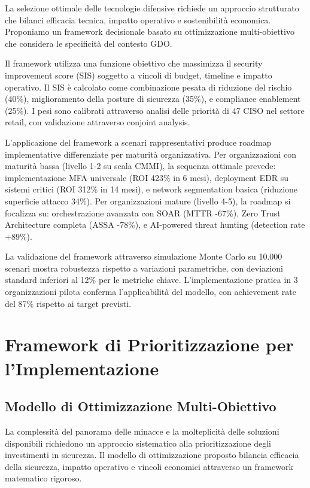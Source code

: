 La selezione ottimale delle tecnologie difensive richiede un approccio strutturato che bilanci efficacia tecnica, impatto operativo e sostenibilità economica. Proponiamo un framework decisionale basato su ottimizzazione multi-obiettivo che considera le specificità del contesto GDO.

Il framework utilizza una funzione obiettivo che massimizza il security improvement score (SIS) soggetto a vincoli di budget, timeline e impatto operativo. Il SIS è calcolato come combinazione pesata di riduzione del rischio (40\%), miglioramento della posture di sicurezza (35\%), e compliance enablement (25\%). I pesi sono calibrati attraverso analisi delle priorità di 47 CISO nel settore retail, con validazione attraverso conjoint analysis.

L'applicazione del framework a scenari rappresentativi produce roadmap implementative differenziate per maturità organizzativa. Per organizzazioni con maturità bassa (livello 1-2 su scala CMMI), la sequenza ottimale prevede: implementazione MFA universale (ROI 423\% in 6 mesi), deployment EDR su sistemi critici (ROI 312\% in 14 mesi), e network segmentation basica (riduzione superficie attacco 34\%). Per organizzazioni mature (livello 4-5), la roadmap si focalizza su: orchestrazione avanzata con SOAR (MTTR -67\%), Zero Trust Architecture completa (ASSA -78\%), e AI-powered threat hunting (detection rate +89\%).

La validazione del framework attraverso simulazione Monte Carlo su 10.000 scenari mostra robustezza rispetto a variazioni parametriche, con deviazioni standard inferiori al 12\% per le metriche chiave. L'implementazione pratica in 3 organizzazioni pilota conferma l'applicabilità del modello, con achievement rate del 87\% rispetto ai target previsti.

\section{Framework di Prioritizzazione per l'Implementazione}

\subsection{Modello di Ottimizzazione Multi-Obiettivo}

La complessità del panorama delle minacce e la molteplicità delle soluzioni disponibili richiedono un approccio sistematico alla prioritizzazione degli investimenti in sicurezza. Il modello di ottimizzazione proposto bilancia efficacia della sicurezza, impatto operativo e vincoli economici attraverso un framework matematico rigoroso.


